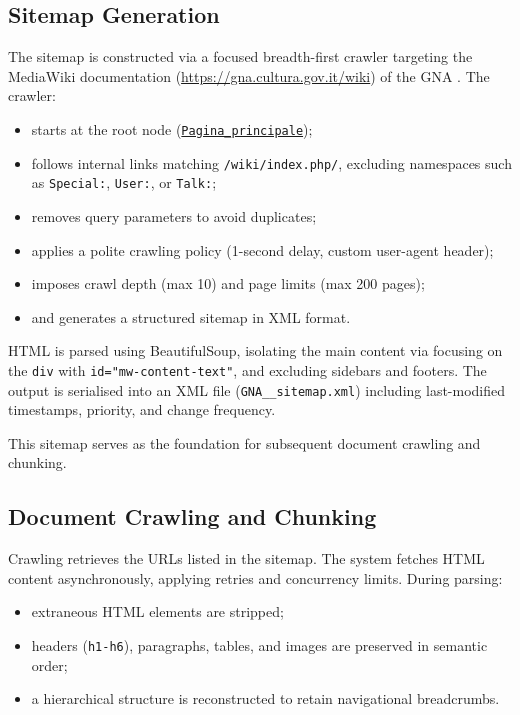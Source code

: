 \begin{spacing}{1.5}
\subsection{Sitemap Generation}
The sitemap is constructed via a focused breadth-first crawler targeting the MediaWiki documentation (\url{https://gna.cultura.gov.it/wiki}) of the GNA \citep{mic_mic_2019}. 
The crawler:
\begin{itemize}
      \item starts at the root node (\texttt{\href{https://web.archive.org/web/20250803092155/https://gna.cultura.gov.it/wiki/index.php/Pagina_principale}{Pagina\_principale}}\nocite{noauthor_wiki_2025});
      \item follows internal links matching \texttt{/wiki/index.php/}, excluding namespaces such as \texttt{Special:}, \texttt{User:}, or \texttt{Talk:};
      \item removes query parameters to avoid duplicates;
      \item applies a polite crawling policy (1-second delay, custom user-agent header);
      \item imposes crawl depth (max 10) and page limits (max 200 pages);
      \item and generates a structured sitemap in XML format.
\end{itemize}

HTML is parsed using BeautifulSoup, isolating the main content via focusing on the \texttt{div} with \texttt{id="mw-content-text"}, and excluding sidebars and footers. The output is serialised into an XML file (\texttt{GNA\_\_sitemap.xml}) including last-modified timestamps, priority, and change frequency. 

This sitemap serves as the foundation for subsequent document crawling and chunking.

\subsection{Document Crawling and Chunking}
Crawling retrieves the URLs listed in the sitemap. The system fetches HTML content asynchronously, applying retries and concurrency limits. During parsing:
\begin{itemize}
      \item extraneous HTML elements are stripped;
      \item headers (\texttt{h1-h6}), paragraphs, tables, and images are preserved in semantic order;
      \item a hierarchical structure is reconstructed to retain navigational breadcrumbs.
\end{itemize}
      

\end{spacing}

